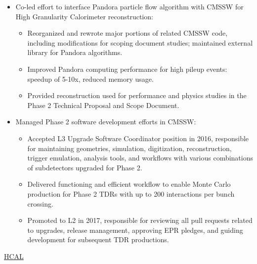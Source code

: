 \begin{itemize}[leftmargin=12pt]
\item Co-led effort to interface Pandora particle flow algorithm with CMSSW for High Granularity Calorimeter reconstruction:
\begin{itemize}
\item Reorganized and rewrote major portions of related CMSSW code, including modifications for scoping document studies; maintained external library for Pandora algorithms.
\item Improved Pandora computing performance for high pileup events: speedup of 5-10x, reduced memory usage.
\item Provided reconstruction used for performance and physics studies in the Phase 2 Technical Proposal and Scope Document.
\end{itemize}
\item Managed Phase 2 software development efforts in CMSSW:
\begin{itemize}
\item Accepted L3 Upgrade Software Coordinator position in 2016, responsible for maintaining geometries, simulation, digitization, reconstruction, trigger emulation, analysis tools, and workflows with various combinations of subdetectors upgraded for Phase 2.
\item Delivered functioning and efficient workflow to enable Monte Carlo production for Phase 2 TDRs with up to 200 interactions per bunch crossing.
\item Promoted to L2 in 2017, responsible for reviewing all pull requests related to upgrades, release management, approving EPR pledges, and guiding development for subsequent TDR productions.
\end{itemize}
\end{itemize}
\underline{HCAL}
